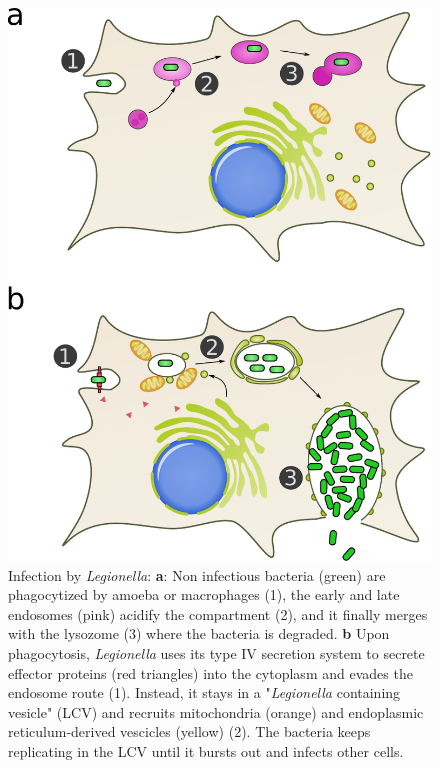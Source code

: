 \begin{figure}[b]
    \includegraphics[width=\textwidth]{Parts/Part01/gfx/legionella_life_cycle.pdf}
    \caption[Infection by \textit{Legionella}.]{Infection by \textit{Legionella}: \textbf{a}: Non infectious bacteria (green) are phagocytized by amoeba or macrophages (1), the early and late endosomes (pink) acidify the compartment (2), and it finally merges with the lysozome (3) where the bacteria is degraded. \textbf{b} Upon phagocytosis, \textit{Legionella} uses its type IV secretion system to secrete effector proteins (red triangles) into the cytoplasm and evades the endosome route (1). Instead, it stays in a "\textit{Legionella} containing vesicle" (LCV) and recruits mitochondria (orange) and endoplasmic reticulum-derived vescicles (yellow) (2). The bacteria keeps replicating in the LCV until it bursts out and infects other cells.}
	\label{fig:01-01:legionella}
\end{figure}

